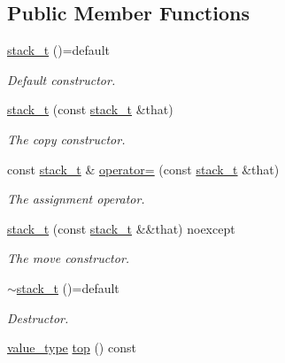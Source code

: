 \subsection*{Public Member Functions}
\begin{DoxyCompactItemize}
\item 
\mbox{\label{classatom_1_1stack__t_a03f4e7718f28fc1e62e70ad202f21d90}} 
\hyperlink{classatom_1_1stack__t_a03f4e7718f28fc1e62e70ad202f21d90}{stack\+\_\+t} ()=default
\begin{DoxyCompactList}\small\item\em Default constructor. \end{DoxyCompactList}\item 
\hyperlink{classatom_1_1stack__t_a519cc745d74f25e1e73168d63bd7ce4a}{stack\+\_\+t} (const \hyperlink{classatom_1_1stack__t}{stack\+\_\+t} \&that)
\begin{DoxyCompactList}\small\item\em The copy constructor. \end{DoxyCompactList}\item 
const \hyperlink{classatom_1_1stack__t}{stack\+\_\+t} \& \hyperlink{classatom_1_1stack__t_a9b0f89271398f910e88a88014f29669d}{operator=} (const \hyperlink{classatom_1_1stack__t}{stack\+\_\+t} \&that)
\begin{DoxyCompactList}\small\item\em The assignment operator. \end{DoxyCompactList}\item 
\hyperlink{classatom_1_1stack__t_a2423a055415e15266b1625ad78b38baf}{stack\+\_\+t} (const \hyperlink{classatom_1_1stack__t}{stack\+\_\+t} \&\&that) noexcept
\begin{DoxyCompactList}\small\item\em The move constructor. \end{DoxyCompactList}\item 
\mbox{\label{classatom_1_1stack__t_a08decda2a6cd788029c0d6b58b8d20b9}} 
\hyperlink{classatom_1_1stack__t_a08decda2a6cd788029c0d6b58b8d20b9}{$\sim$stack\+\_\+t} ()=default
\begin{DoxyCompactList}\small\item\em Destructor. \end{DoxyCompactList}\item 
\hyperlink{classatom_1_1stack__t_a37733753643a75fca01979480f888d8e}{value\+\_\+type} \hyperlink{classatom_1_1stack__t_a80818d88b68e425c679abbfda849c005}{top} () const

\end{DoxyCompactItemize}
